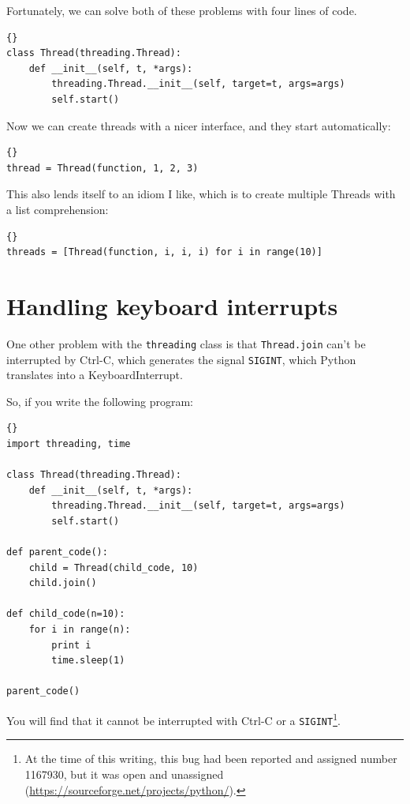 \documentclass{book}
\begin{document}
Fortunately, we can solve both of these problems with four
lines of code.

\begin{lstlisting}[title={Cleaned-up Thread class}]{}
class Thread(threading.Thread):
    def __init__(self, t, *args):
        threading.Thread.__init__(self, target=t, args=args)
        self.start()
\end{lstlisting}

Now we can create threads with a nicer interface, and they
start automatically:

\begin{lstlisting}[title={Thread example (my way)}]{}
thread = Thread(function, 1, 2, 3)
\end{lstlisting}

This also lends itself to an idiom I like, which is to create
multiple Threads with a list comprehension:

\begin{lstlisting}[title={Multiple thread example}]{}
threads = [Thread(function, i, i, i) for i in range(10)]
\end{lstlisting}

\section{Handling keyboard interrupts}

One other problem with the {\tt threading} class is that 
{\tt Thread.join} can't be interrupted by Ctrl-C, which
generates the signal {\tt SIGINT}, which Python translates
into a KeyboardInterrupt.

\newpage
So, if you write the following program:

\begin{lstlisting}[title={Unstoppable program}]{}
import threading, time

class Thread(threading.Thread):
    def __init__(self, t, *args):
        threading.Thread.__init__(self, target=t, args=args)
        self.start()

def parent_code():
    child = Thread(child_code, 10)
    child.join()

def child_code(n=10):
    for i in range(n):
        print i
        time.sleep(1)
    
parent_code()
\end{lstlisting}

You will find that it cannot be interrupted with Ctrl-C or
a {\tt SIGINT}\footnote{At the time of this writing, this
bug had been reported and assigned number 1167930, but it was
open and unassigned (\url{https://sourceforge.net/projects/python/}).}.
\end{document}
